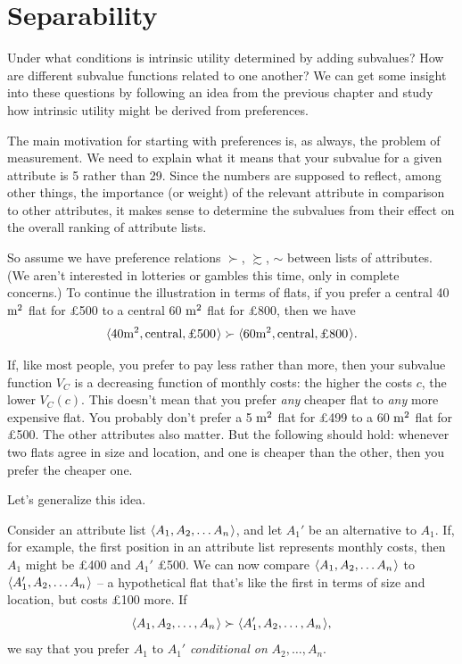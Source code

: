 \section{Separability}\label{sec:separability}

Under what conditions is intrinsic utility determined by adding subvalues? How are different
subvalue functions related to one another? We can get some insight into these
questions by following an idea from the previous chapter and study how intrinsic
utility might be derived from preferences.


The main motivation for starting with preferences is, as always, the problem of
measurement. We need to explain what it means that your subvalue for a given
attribute is 5 rather than 29. Since the numbers are supposed to reflect, among
other things, the importance (or weight) of the relevant attribute in comparison
to other attributes, it makes sense to determine the subvalues from their effect
on the overall ranking of attribute lists.

So assume we have preference relations $\succ$, $\succsim$, $\sim$ between lists
of attributes. (We aren't interested in lotteries or gambles this time, only in
complete concerns.) To continue the illustration in terms of flats, if you
prefer a central \mbox{40 $\text{m}^2$} flat for £500 to a central 60 $\text{m}^2$ flat for £800,
then we have
\[
 \t{40 \m^2, \text{central}, \text{£500}} \succ
 \t{60 \m^2, \text{central}, \text{£800}}.
\]

If, like most people, you prefer to pay less rather than more, then your
subvalue function $V_C$ is a decreasing function of monthly costs: the higher
the costs $c$, the lower $V_C(c)$. This doesn't mean that you prefer \emph{any}
cheaper flat to \emph{any} more expensive flat. You probably don't prefer a 5
$\text{m}^2$ flat for £499 to a 60 $\text{m}^2$ flat for £500. The other attributes also
matter. But the following should hold: whenever two flats agree in size and
location, and one is cheaper than the other, then you prefer the cheaper one.

Let's generalize this idea.

Consider an attribute list $\t{A_{1}, A_{2}, \ldots A_{n}}$, and let $A_{1}'$ be
an alternative to $A_{1}$. If, for example, the first position in an attribute
list represents monthly costs, then $A_{1}$ might be £400 and $A_{1}'$ £500. We
can now compare $\t{A_{1}, A_{2}, \ldots A_{n}}$ to
$\t{A_{1}', A_{2}, \ldots A_{n}}$ -- a hypothetical flat that's like the first
in terms of size and location, but costs £100 more. If
\[
   \t{A_1,A_2,\ldots,A_n} \succ \t{A_1',A_2,\ldots,A_n},
\]
we say that you prefer $A_1$ to $A_1'$ \emph{conditional on}
$A_{2},\ldots,A_{n}$.

